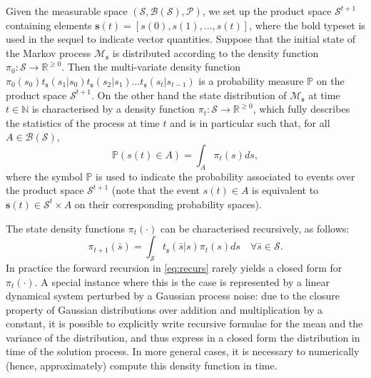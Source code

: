\documentclass{LMCS}
\begin{document}
Given the measurable space $\left(\mathcal S,\mathcal B(\mathcal S), \mathcal P\right)$, we set up the product space $\mathcal S^{t+1}$
containing elements $\mathbf s(t) = \left[s(0),s(1),\ldots,s(t)\right]$, where the bold typeset is used in the sequel to indicate vector quantities.
Suppose that the initial state of the Markov process $\mathscr M_{\mathfrak s}$ is distributed according to the density function $\pi_0:\mathcal S\rightarrow \mathbb R^{\ge 0}$. Then the multi-variate density function $\pi_0(s_0)t_{\mathfrak s}(s_1|s_0)t_{\mathfrak s}(s_2|s_1)\ldots t_{\mathfrak s}(s_t|s_{t-1})$
is a probability measure $\mathbb P$ on the product space $\mathcal S^{t+1}$.
On the other hand the state distribution of $\mathscr M_{\mathfrak s}$ at time $t \in \mathbb N$ is characterised by a density function $\pi_t:\mathcal S\rightarrow \mathbb R^{\ge 0}$,
which fully describes the statistics of the process at time $t$ and is in particular such that, 
for all $A \in \mathcal B(\mathcal S)$, 
\begin{equation*}
\mathbb P(s(t)\in A) = \int_{A} \pi_t(s)ds,
\end{equation*}
where the symbol $\mathbb P$ is used to indicate the probability associated to events over the product space $\mathcal S^{t+1}$
(note that the event $s(t)\in A$ is equivalent to $\mathbf s(t)\in\mathcal S^t\times A$ on their corresponding probability spaces).

The state density functions $\pi_{t}(\cdot)$ can be characterised recursively, as follows: 
\begin{equation}
\label{eq:recurs}
\pi_{t+1}(\bar s) = \int_{\mathcal S}t_{\mathfrak s}(\bar s|s)\pi_t(s)ds \quad \forall\bar s \in \mathcal S.
\end{equation}
In practice the forward recursion in \eqref{eq:recurs} rarely yields a closed form for $\pi_t(\cdot)$.  
A special instance where this is the case is represented by a linear dynamical system perturbed by a Gaussian process noise: 
due to the closure property of Gaussian distributions over addition and multiplication by a constant,  
it is possible to explicitly write recursive formulae for the mean and the variance of the distribution, 
and thus express in a closed form the distribution in time of the solution process.  
In more general cases, it is necessary to numerically (hence, approximately) compute this density function in time.    

\medskip
\end{document}

